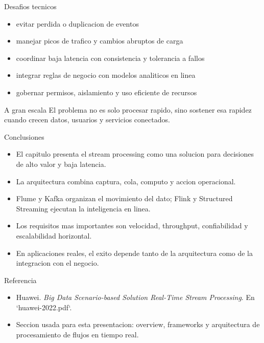 \documentclass[aspectratio=169]{beamer}
\begin{document}
\begin{frame}{Desafios tecnicos}
  \begin{itemize}
    \item evitar perdida o duplicacion de eventos
    \item manejar picos de trafico y cambios abruptos de carga
    \item coordinar baja latencia con consistencia y tolerancia a fallos
    \item integrar reglas de negocio con modelos analiticos en linea
    \item gobernar permisos, aislamiento y uso eficiente de recursos
  \end{itemize}
  \vspace{0.2cm}
  \begin{block}{A gran escala}
    El problema no es solo procesar rapido, sino sostener esa rapidez cuando crecen datos, usuarios y servicios conectados.
  \end{block}
\end{frame}

\begin{frame}{Conclusiones}
  \begin{itemize}
    \item El capitulo presenta el stream processing como una solucion para decisiones de alto valor y baja latencia.
    \item La arquitectura combina captura, cola, computo y accion operacional.
    \item Flume y Kafka organizan el movimiento del dato; Flink y Structured Streaming ejecutan la inteligencia en linea.
    \item Los requisitos mas importantes son velocidad, throughput, confiabilidad y escalabilidad horizontal.
    \item En aplicaciones reales, el exito depende tanto de la arquitectura como de la integracion con el negocio.
  \end{itemize}
\end{frame}

\begin{frame}{Referencia}
  \small
  \begin{itemize}
    \item Huawei. \textit{Big Data Scenario-based Solution Real-Time Stream Processing}. En `huawei-2022.pdf`.
    \item Seccion usada para esta presentacion: overview, frameworks y arquitectura de procesamiento de flujos en tiempo real.
  \end{itemize}
\end{frame}
\end{document}
